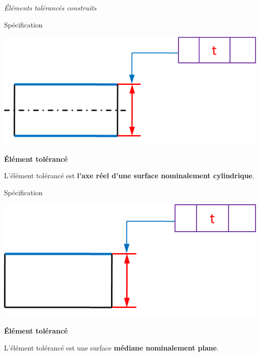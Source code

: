 \documentclass[11pt,oneside]{article}
\begin{document}
\begin{exemple}

\textit{Éléments tolérancés construits}

\begin{minipage}[t]{.45\linewidth}
\begin{center}
Spécification

\includegraphics[width=.95\textwidth]{png/et_cycl_cons}
\end{center}
\end{minipage} \hfill
\begin{minipage}[t]{.45\linewidth}
\begin{center}
\textbf{Élément tolérancé}
\end{center}

L'élément tolérancé est \textbf{l'axe réel d'une surface nominalement cylindrique}.
\end{minipage} 

\begin{minipage}[t]{.45\linewidth}
\begin{center}
Spécification

\includegraphics[width=.95\textwidth]{png/et_plan_cons}
\end{center}
\end{minipage} \hfill
\begin{minipage}[t]{.45\linewidth}
\begin{center}
\textbf{Élément tolérancé}
\end{center}

L'élément tolérancé est une surface \textbf{médiane nominalement plane}.
\end{minipage} 
\end{exemple}
\end{document}
